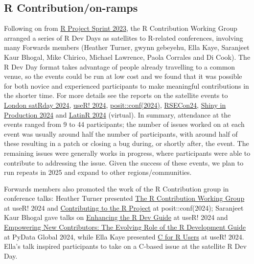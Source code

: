 \hypertarget{r-contributionon-ramps}{%
\subsection{R Contribution/on-ramps}\label{r-contributionon-ramps}}

Following on from \href{https://contributor.r-project.org/r-project-sprint-2023/}{R Project Sprint 2023},
the R Contribution Working Group arranged a series of R Dev Days as satellites
to R-related conferences, involving many Forwards members (Heather Turner,
gwynn gebeyehu, Ella Kaye, Saranjeet Kaur Bhogal, Mike Chirico,
Michael Lawrence, Paola Corrales and Di Cook). The R Dev Day format takes
advantage of people already travelling to a common venue, so the events could be
run at low cost and we found that it was possible for both novice and
experienced participants to make meaningful contributions in the shorter time.
For more details see the reports on the satellite events to \href{https://github.com/r-devel/r-dev-day/blob/main/reports/2024-04_imperial2024.md}{London satRday 2024},
\href{https://github.com/r-devel/r-dev-day/blob/main/reports/2024-07_plus2024/plus2024.md}{useR! 2024}, \href{https://github.com/r-devel/r-dev-day/blob/main/reports/2024-08_hutch2024.md}{posit::conf(2024)}, \href{https://github.com/r-devel/r-dev-day/blob/main/reports/2024-09_RSECon24.md}{RSECon24}, \href{https://github.com/r-devel/r-dev-day/blob/main/reports/2024-10_sip2024/sip2024.md}{Shiny in Production 2024} and
\href{https://github.com/r-devel/r-dev-day/blob/main/reports/2024-11-18_LatinR2025.md}{LatinR 2024} (virtual).
In summary, attendance at the events ranged from 9 to 44 participants; the
number of issues worked on at each event was usually around half the number of
participants, with around half of these resulting in a patch or closing a bug
during, or shortly after, the event. The remaining issues were generally works in
progress, where participants were able to contribute to addressing the issue.
Given the success of these events, we plan to run repeats in 2025 and expand to
other regions/communities.

Forwards members also promoted the work of the R Contribution group in
conference talks: Heather Turner presented \href{https://hturner.github.io/useR2024/\#/title-slide}{The R Contribution Working Group}
at useR! 2024 and \href{https://youtu.be/gegeaoMSgzc?list=PL9HYL-VRX0oSFkdF4fJeY63eGDvgofcbn}{Contributing to the R Project} at posit::conf(2024); Saranjeet Kaur Bhogal gave talks on \href{https://youtu.be/vit06hXFw3M}{Enhancing the R Dev Guide} at useR! 2024 and \href{https://global2024.pydata.org/cfp/talk/JVRYGZ/}{Empowering New Contributors: The Evolving Role of the R Development Guide} at PyData Global 2024, while Ella Kaye presented \href{https://ellakaye.co.uk/talks/2024-07-10_c-for-r-users/}{C for R Users} at useR! 2024. Ella's talk inspired participants to take on a C-based issue at
the satellite R Dev Day.

